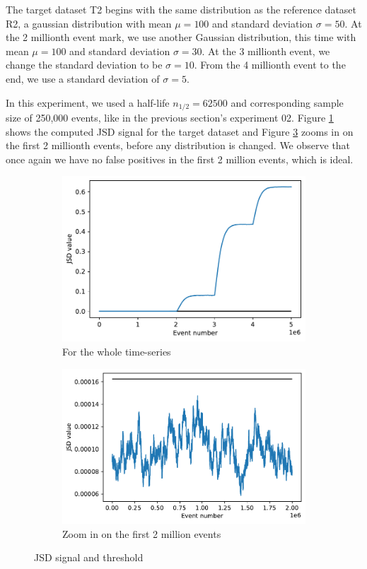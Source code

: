 The target dataset T2 begins with the same distribution as the reference dataset R2, a gaussian distribution with mean $\mu=100$ and standard deviation $\sigma=50$. At the 2 millionth event mark, we use another Gaussian distribution, this time with mean $\mu=100$ and standard deviation $\sigma=30$. At the 3 millionth event, we change the standard deviation to be $\sigma=10$. From the 4 millionth event to the end, we use a standard deviation of $\sigma=5$. 

In this experiment, we used a half-life $n_{1/2}=62500$ and corresponding sample size of 250,000 events, like in the previous section's experiment 02. Figure \ref{fig:JSD-signal-test02} shows the computed JSD signal for the target dataset and Figure \ref{fig:JSD-signal-zoom-test02} zooms in on the first 2 millionth events, before any distribution is changed. We observe that once again we have no false positives in the first 2 million events, which is ideal. 
\begin{figure}[!htb]
\centering
\begin{subfigure}{.5\textwidth}
  \centering
  \includegraphics[width=1\linewidth]{figures/stream-analysis-viz-test02.pdf}
  \caption{For the whole time-series}
  \label{fig:JSD-signal-test02}
\end{subfigure}%
\begin{subfigure}{.5\textwidth}
  \centering
  \includegraphics[width=1\linewidth]{figures/stream-analysis-viz-zoom-test02.pdf}
  \caption{Zoom in on the first 2 million events}
  \label{fig:JSD-signal-zoom-test02}
\end{subfigure}
\caption{JSD signal and threshold}
\end{figure}
